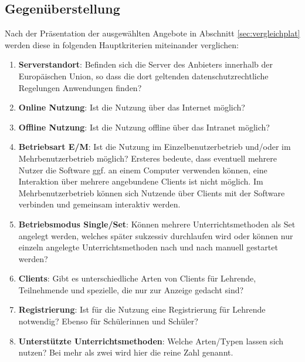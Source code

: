 \subsection{Gegenüberstellung}\label{sec:gegenstellung}
Nach der Präsentation der ausgewählten Angebote in Abschnitt \ref{sec:vergleichplat} werden diese in folgenden Hauptkriterien miteinander verglichen:
\begin{enumerate}
	\item \textbf{Serverstandort}: Befinden sich die Server des Anbieters innerhalb der Europäischen Union, so dass die dort geltenden datenschutzrechtliche Regelungen Anwendungen finden?
	\item \textbf{Online Nutzung}: Ist die Nutzung über das Internet möglich? 
	\item \textbf{Offline Nutzung}: Ist die Nutzung offline über das Intranet möglich? 
	\item \textbf{Betriebsart E/M}: Ist die Nutzung im Einzelbenutzerbetrieb und/oder im Mehrbenutzerbetrieb möglich? Ersteres bedeute, dass eventuell mehrere Nutzer die Software ggf. an einem Computer verwenden können, eine Interaktion über mehrere angebundene Clients ist nicht möglich. Im Mehrbenutzerbetrieb können sich Nutzende über Clients mit der Software verbinden und gemeinsam interaktiv werden.
	\item \textbf{Betriebsmodus Single/Set}: Können mehrere Unterrichtsmethoden als Set angelegt werden, welches später sukzessiv durchlaufen wird oder können nur einzeln angelegte Unterrichtsmethoden nach und nach manuell gestartet werden?
	\item \textbf{Clients}: Gibt es unterschiedliche  Arten von Clients für Lehrende, Teilnehmende und spezielle, die nur zur Anzeige gedacht sind?
	\item \textbf{Registrierung}: Ist für die Nutzung eine Registrierung für Lehrende notwendig? Ebenso für Schülerinnen und Schüler?
	\item \textbf{Unterstützte Unterrichtsmethoden}: Welche Arten/Typen lassen sich nutzen? Bei mehr als zwei wird hier die reine Zahl genannt.  
\end{enumerate}


